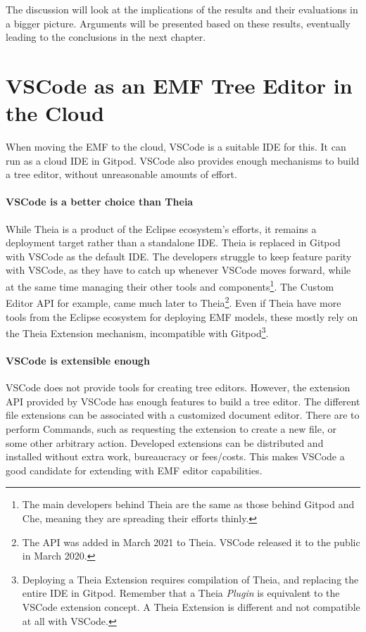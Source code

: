 The discussion will look at the implications of the results and their evaluations in a bigger picture.
Arguments will be presented based on these results, eventually leading to the conclusions in the next chapter.

\section{VSCode as an EMF Tree Editor in the Cloud}
When moving the \acrlong{EMF} to the cloud, \gls{VSCode} is a suitable \acrshort{IDE} for this.
It can run as a \gls{cloud} \acrshort{IDE} in \gls{Gitpod}.
\gls{VSCode} also provides enough mechanisms to build a tree editor, without unreasonable amounts of effort.

\paragraph{VSCode is a better choice than Theia}
While \gls{Theia} is a product of the Eclipse ecosystem's efforts, it remains a deployment target rather than a standalone \acrshort{IDE}.
Theia is replaced in \gls{Gitpod} with \gls{VSCode} as the default \acrshort{IDE}.
The developers struggle to keep feature parity with \gls{VSCode}, as they have to catch up whenever \gls{VSCode} moves forward, while at the same time managing their other tools and components\footnote{The main developers behind \gls{Theia} are the same as those behind \gls{Gitpod} and \gls{Che}, meaning they are spreading their efforts thinly.}.
The Custom Editor \acrshort{API} for example, came much later to \gls{Theia}\footnote{The API was added in March 2021 to Theia. VSCode released it to the public in March 2020.}.
Even if \gls{Theia} have more tools from the Eclipse ecosystem for deploying \acrshort{EMF} models, these mostly rely on the Theia Extension mechanism, incompatible with \gls{Gitpod}\footnote{Deploying a Theia Extension requires compilation of Theia, and replacing the entire IDE in Gitpod. Remember that a Theia \textit{Plugin} is equivalent to the VSCode extension concept. A Theia Extension is different and not compatible at all with VSCode.}.

\paragraph{VSCode is extensible enough}
\gls{VSCode} does not provide tools for creating tree editors.
However, the extension \acrshort{API} provided by \gls{VSCode} has enough features to build a tree editor.
The different file extensions can be associated with a customized document editor.
There are  to perform Commands, such as requesting the extension to create a new file, or some other arbitrary action.
Developed extensions can be distributed and installed without extra work, bureaucracy or fees/costs.
This makes \gls{VSCode} a good candidate for extending with \acrshort{EMF} editor capabilities.

